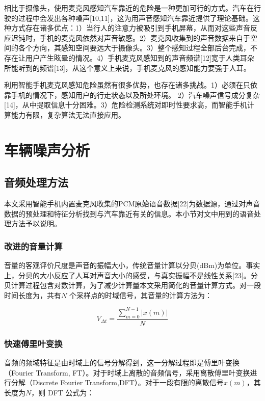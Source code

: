 相比于摄像头，使用麦克风感知汽车靠近的危险是一种更加可行的方式。汽车在行驶的过程中会发出各种噪声[10,11]，这为用声音感知汽车靠近提供了理论基础。这种方式存在诸多优点：1）当行人的注意力被吸引到手机屏幕，从而对这些声音反应迟钝时，手机的麦克风依然对声音敏感。2）麦克风收集到的声音数据来自于空间的各个方向，其感知空间要远大于摄像头。3）整个感知过程全部后台完成，不存在让用户产生眩晕的情况。4）手机麦克风感知到的声音频谱[12]宽于人类耳朵所能听到的频谱[13]，从这个意义上来说，手机麦克风的感知能力要强于人耳。


利用智能手机麦克风感知危险虽然有很多优势，也存在诸多挑战。1）必须在只依靠手机的情况下，感知用户的行走状态以及所处环境。 2）汽车噪声信号成分复杂[14]，从中提取信息十分困难。3）危险检测系统对即时性要求高，而智能手机计算能力有限，复杂算法无法直接应用。



\section{车辆噪声分析}

\subsection{音频处理方法}
本文采用智能手机内置麦克风收集的PCM原始语音数据[22]为数据源，通过对声音数据的预处理和特征分析找到与汽车靠近有关的信息。本小节对文中用到的语音处理方法予以说明。

\subsubsection{改进的音量计算}
音量的客观评价尺度是声音的振幅大小，传统音量计算以分贝(dBm)为单位。事实上，分贝的大小反应了人耳对声音大小的感受，与真实振幅不是线性关系[23]。分贝计算过程包含对数计算，为了减少计算量本文采用简化的音量计算方式。对一段时间长度为，共有$N$ 个采样点的时域信号，其音量的计算方法为：

\begin{equation}
\label{equ:chap3:volume}
V_{\Delta t}= \frac{\sum_{m=0}^{N-1}\left | x\left ( m \right ) \right |}{N}
\end{equation}

\subsubsection{快速傅里叶变换}
音频的频域特征是由时域上的信号分解得到，这一分解过程即是傅里叶变换（Fourier Transform, FT）。对于时域上离散的音频信号，采用离散傅里叶变换进行分解（Discrete Fourier Transform,DFT）。对于一段有限的离散信号$x(m)$，其长度为$N$，则 DFT 公式为：

